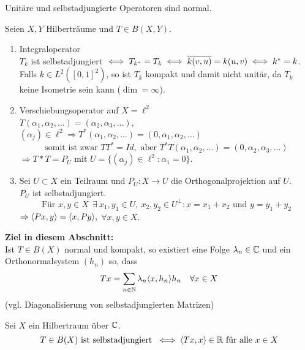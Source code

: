 \begin{bemerkung*}
	Unitäre und selbstadjungierte Operatoren sind normal.	
\end{bemerkung*}


\begin{beispiel}
	Seien $X, Y$ Hilberträume und $T \in B(X, Y)$.
	\begin{enumerate}[label=\alph*\upshape)]
		\item Integraloperator \\
			$T_{k}$	ist selbstadjungiert $\iff T_{k^{*}} = T_{k} \iff \overline{k(v, u)} = k(u, v) \iff k^{*} = k$. \\
			Falls $k \in L^{2}\left([0, 1]^{2}\right)$, so ist $T_{k}$ kompakt und damit nicht unitär, da $T_{k}$ keine Isometrie sein kann ($\dim = \infty$).
		\item Verschiebungsoperator auf $X = \ell^{2}$ \\
			$T(\alpha_{1}, \alpha_{2}, \dotsc ) = (\alpha_{2}, \alpha_{3}, \dotsc )$, $(\alpha_{j}) \in \ell^{2} \Rightarrow T^{*}(\alpha_{1}, \alpha_{2}, \dotsc ) = (0, \alpha_{1}, \alpha_{2}, \dotsc )$ \\
			\[ \text{somit ist zwar } T T^{*} = Id, \text { aber } T^{*} T (\alpha_{1}, \alpha_{2}, \dotsc ) = (0, \alpha_{2}, \alpha_{3}, \dotsc ) \]
			$\Rightarrow T* T = P_{U}$ mit $U = \{ (\alpha_{j}) \in \ell^{2} \colon \alpha_{1} = 0 \}$.
		\item Sei $U \subset X$ ein Teilraum und $P_{U} \colon X \rightarrow U$ die Orthogonalprojektion auf $U$. \\
			$P_{U}$ ist selbstadjungiert.
			\[ \text{Für } x, y \in X ~ ~ \exists ~ x_{1}, y_{1} \in U, ~ x_{2}, y_{2} \in U^{\bot}: x = x_{1} + x_{2} \text{ und } y = y_{1} + y_{2} \]
			$\Rightarrow \langle P x , y \rangle = \langle x , P y \rangle,$ $\forall x,y \in X$.
	\end{enumerate}
\end{beispiel}



\textbf{Ziel in diesem Abschnitt:} \\
	Ist $T \in B(X)$ normal und kompakt, so existiert eine Folge $\lambda_{n} \in \mathbb{C}$ und ein Orthonormalsystem $(h_{n})$ so, dass
	\[ T x = \sum_{n \in \mathbb{N}} \lambda_{n} \langle x , h_{n} \rangle h_{n} \quad \forall x \in X \]	
	(vgl. Diagonalisierung von selbstadjungierten Matrizen)



\begin{satz}
	Sei $X$ ein Hilbertraum über $\mathbb{C}$. \\
		\[ T \in B(X) \text{ ist selbstadjungiert } \iff \langle T x , x \rangle \in \mathbb{R} \text{ für alle } x \in X \]
\end{satz}

